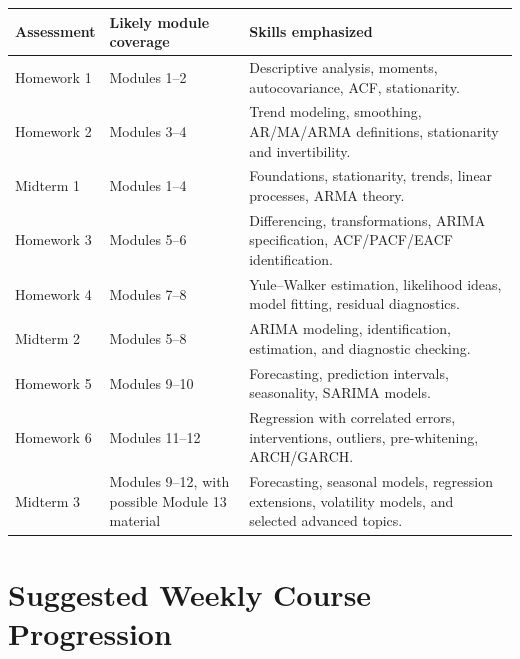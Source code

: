 \documentclass[11pt]{article}
\begin{document}
\begin{longtable}{p{} p{} p{}}
\toprule
\textbf{Assessment} & \textbf{Likely module coverage} & \textbf{Skills emphasized} \\
\midrule
\endhead

Homework 1 &
Modules 1--2 &
Descriptive analysis, moments, autocovariance, ACF, stationarity. \\

Homework 2 &
Modules 3--4 &
Trend modeling, smoothing, AR/MA/ARMA definitions, stationarity and
invertibility. \\

Midterm 1 &
Modules 1--4 &
Foundations, stationarity, trends, linear processes, ARMA theory. \\

Homework 3 &
Modules 5--6 &
Differencing, transformations, ARIMA specification, ACF/PACF/EACF
identification. \\

Homework 4 &
Modules 7--8 &
Yule--Walker estimation, likelihood ideas, model fitting, residual
diagnostics. \\

Midterm 2 &
Modules 5--8 &
ARIMA modeling, identification, estimation, and diagnostic checking. \\

Homework 5 &
Modules 9--10 &
Forecasting, prediction intervals, seasonality, SARIMA models. \\

Homework 6 &
Modules 11--12 &
Regression with correlated errors, interventions, outliers, pre-whitening,
ARCH/GARCH. \\

Midterm 3 &
Modules 9--12, with possible Module 13 material &
Forecasting, seasonal models, regression extensions, volatility models, and
selected advanced topics. \\

\bottomrule
\end{longtable}

\section{Suggested Weekly Course Progression}
\end{document}
